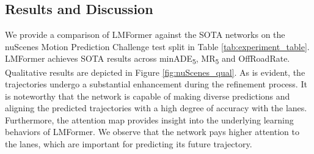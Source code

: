 \subsection{Results and Discussion}\label{subsection:results}
\begin{table}[b]
    \centering
    \caption{Comparison with state-of-the-art on the nuScenes prediction challenge test split.}
    \label{tab:experiment_table}
\end{table}

We provide a comparison of LMFormer against the SOTA networks on the nuScenes Motion Prediction Challenge test split \cite{nuscene2020prediction} in Table \ref{tab:experiment_table}. LMFormer achieves SOTA results across minADE\textsubscript{5}, MR\textsubscript{5} and OffRoadRate. Qualitative results are depicted in Figure \ref{fig:nuScenes_qual}. As is evident, the trajectories undergo a substantial enhancement during the refinement process. It is noteworthy that the network is capable of making diverse predictions and aligning the predicted trajectories with a high degree of accuracy with the lanes. Furthermore, the attention map provides insight into the underlying learning behaviors of LMFormer. We observe that the network pays higher attention to the lanes, which are important for predicting its future trajectory.

